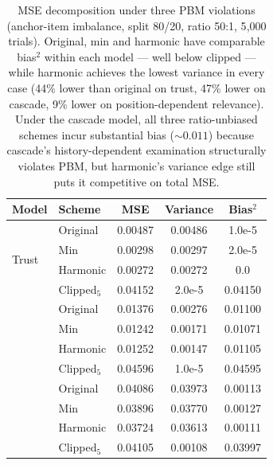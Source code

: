 \documentclass[sigconf]{acmart}
\begin{document}
\begin{table}[h]
    \small
    \centering
    \begin{tabular}{llccc}
        \toprule
        Model & Scheme & MSE & Variance & Bias$^2$ \\
        \midrule
        \multirow{4}{*}{Trust}     & Original    & 0.00487 & 0.00486 & 1.0e-5 \\
                                    & Min         & 0.00298 & 0.00297 & 2.0e-5 \\
                                    & Harmonic    & 0.00272 & 0.00272 & 0.0    \\
                                    & Clipped$_5$ & 0.04152 & 2.0e-5  & 0.04150 \\
        \addlinespace
        \multirow{4}{*}{Cascade}   & Original    & 0.01376 & 0.00276 & 0.01100 \\
                                    & Min         & 0.01242 & 0.00171 & 0.01071 \\
                                    & Harmonic    & 0.01252 & 0.00147 & 0.01105 \\
                                    & Clipped$_5$ & 0.04596 & 1.0e-5  & 0.04595 \\
        \addlinespace
        \multirow{4}{*}{Pos.-dep.} & Original    & 0.04086 & 0.03973 & 0.00113 \\
                                    & Min         & 0.03896 & 0.03770 & 0.00127 \\
                                    & Harmonic    & 0.03724 & 0.03613 & 0.00111 \\
                                    & Clipped$_5$ & 0.04105 & 0.00108 & 0.03997 \\
        \bottomrule
    \end{tabular}
    \caption{MSE decomposition under three PBM violations (anchor-item imbalance,
        split 80/20, ratio 50:1, 5{,}000 trials). Original, min and harmonic have
        comparable bias$^2$ within each model — well below clipped — while harmonic
        achieves the lowest variance in every case (44\% lower than original on trust,
        47\% lower on cascade, 9\% lower on position-dependent relevance). Under the
        cascade model, all three ratio-unbiased schemes incur substantial bias
        ($\sim 0.011$) because cascade's history-dependent examination structurally
        violates PBM, but harmonic's variance edge still puts it competitive on
        total MSE.}
    \label{tab:pbm_violations}
\end{table}
\end{document}

